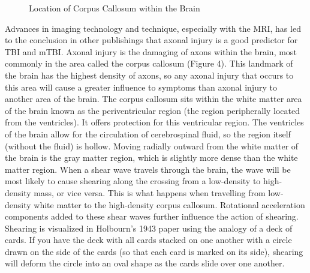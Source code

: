 \documentclass[%
 aip,
 amsmath,amssymb,
 reprint,%
 floatfix,%
]{revtex4-1}
\begin{document}
\begin{figure}
	\centering
	\caption{Location of Corpus Callosum within the Brain}
\end{figure}

Advances in imaging technology and technique, especially with the MRI, has led to the conclusion in other publishings that axonal injury is a good predictor for TBI and mTBI. Axonal injury is the damaging of axons within the brain, most commonly in the area called the corpus callosum (Figure 4). This landmark of the brain has the highest density of axons, so any axonal injury that occurs to this area will cause a greater influence to symptoms than axonal injury to another area of the brain. The corpus callosum sits within the white matter area of the brain known as the periventricular region (the region peripherally located from the ventricles). It offers protection for this ventricular region. The ventricles of the brain allow for the circulation of cerebrospinal fluid, so the region itself (without the fluid) is hollow. Moving radially outward from the white matter of the brain is the gray matter region, which is slightly more dense than the white matter region. When a shear wave travels through the brain, the wave will be most likely to cause shearing along the crossing from a low-density to high-density mass, or vice versa. This is what happens when travelling from low-density white matter to the high-density corpus callosum. Rotational acceleration components added to these shear waves further influence the action of shearing. Shearing is visualized in Holbourn's 1943 paper using the analogy of a deck of cards. If you have the deck with all cards stacked on one another with a circle drawn on the side of the cards (so that each card is marked on its side), shearing will deform the circle into an oval shape as the cards slide over one another.
\end{document}

